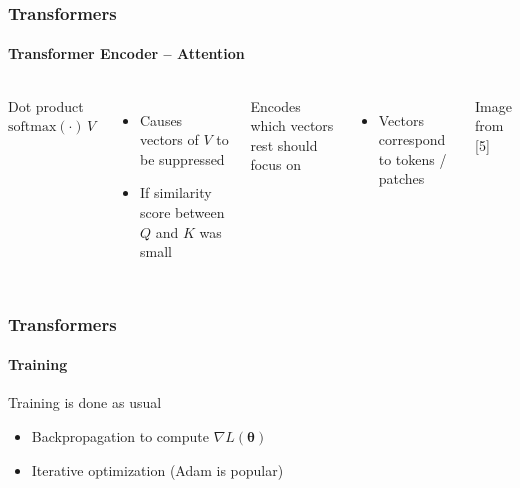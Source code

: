 \documentclass[xetex,professionalfont]{beamer}
\newcommand{\bth}{\boldsymbol{\theta}}
\begin{document}
\begin{frame}
	\frametitle{Transformers}
	\framesubtitle{Transformer Encoder -- Attention}

	\begin{columns}

		Dot product $\text{softmax}(\cdot)\,V$
		\begin{itemize}
			\item Causes vectors of $V$ to be suppressed
			\item If similarity score between $Q$ and $K$ was small
		\end{itemize}

		\bigskip

		Encodes which vectors rest should focus on
		\begin{itemize}
			\item Vectors correspond to tokens / patches
		\end{itemize}


		\begin{center}
			{\centering Image from [5]}
		\end{center}

	\end{columns}

\end{frame}


\begin{frame}
	\frametitle{Transformers}
	\framesubtitle{Training}

	Training is done as usual
	\begin{itemize}
		\item Backpropagation to compute $\nabla L(\bth)$
		\item Iterative optimization (Adam is popular)
	\end{itemize}

\end{frame}
\end{document}
